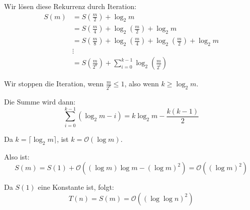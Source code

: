 \documentclass[11pt]{article}
\begin{document}
\begin{enumerate}
	      Wir lösen diese Rekurrenz durch Iteration:
	      \[
		      \begin{aligned}
			      S(m) & = S\left( \frac{m}{2} \right) + \log_2 m                                                                         \\
			           & = S\left( \frac{m}{4} \right) + \log_2 \left( \frac{m}{2} \right) + \log_2 m                                     \\
			           & = S\left( \frac{m}{8} \right) + \log_2 \left( \frac{m}{4} \right) + \log_2 \left( \frac{m}{2} \right) + \log_2 m \\
			           & \vdots                                                                                                           \\
			           & = S\left( \frac{m}{2^{k}} \right) + \sum_{i=0}^{k-1} \log_2 \left( \frac{m}{2^{i}} \right)
		      \end{aligned}
	      \]

	      Wir stoppen die Iteration, wenn \( \frac{m}{2^{k}} \leq 1 \), also wenn \( k \geq \log_2 m \).

	      Die Summe wird dann:
	      \[
		      \sum_{i=0}^{k-1} \left( \log_2 m - i \right ) = k \log_2 m - \frac{k(k-1)}{2}
	      \]

	      Da \( k = \lceil \log_2 m \rceil \), ist \( k = \mathcal{O}(\log m) \).

	      Also ist:
	      \[
		      S(m) = S(1) + \mathcal{O}\left( (\log m) \log m - (\log m)^{2} \right ) = \mathcal{O}\left( (\log m)^{2} \right )
	      \]

	      Da \( S(1) \) eine Konstante ist, folgt:
	      \[
		      T(n) = S(m) = \mathcal{O}\left( (\log \log n)^{2} \right )
	      \]

\end{enumerate}

\end{document}
